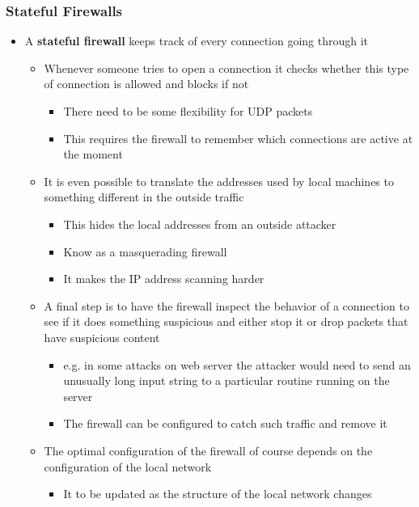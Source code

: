 \documentclass[11pt]{article}
\begin{document}
\subsubsection{Stateful Firewalls}
\label{sec:orga3661ac}
\begin{itemize}
\item A \textbf{stateful firewall} keeps track of every connection going through it
\begin{itemize}
\item Whenever someone tries to open a connection it checks whether this type of connection is allowed and blocks if not
\begin{itemize}
\item There need to be some flexibility for UDP packets
\item This requires the firewall to remember which connections are active at the moment
\end{itemize}
\item It is even possible to translate the addresses used by local machines to something different in the outside traffic
\begin{itemize}
\item This hides the local addresses from an outside attacker
\item Know as a masquerading firewall
\item It makes the IP address scanning harder
\end{itemize}
\item A final step is to have the firewall inspect the behavior of a connection to see if it does something suspicious and either stop it or drop packets that have suspicious content
\begin{itemize}
\item e.g. in some attacks on web server the attacker would need to send an unusually long input string to a particular routine running on the server
\item The firewall can be configured to catch such traffic and remove it
\end{itemize}
\item The optimal configuration of the firewall of course depends on the configuration of the local network
\begin{itemize}
\item It to be updated as the structure of the local network changes
\end{itemize}
\end{itemize}
\end{itemize}
\end{document}
